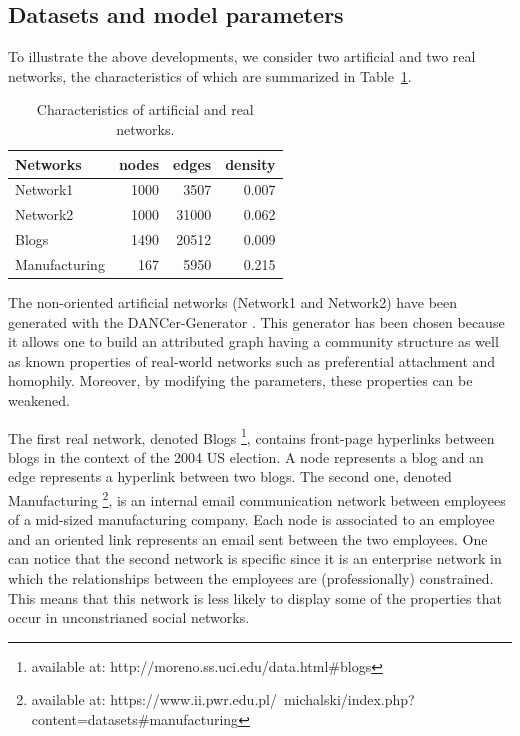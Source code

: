 \subsection{Datasets and model parameters}

To illustrate the above developments, we consider two artificial and two real networks, the characteristics of which are summarized in Table~\ref{table:networks_measures}.

\begin{table}[h] 
	\centering
	\caption{Characteristics of artificial and real networks.}
    \begin{tabular}{lrrr}
        \hline
        \textbf{Networks} &   nodes &   edges &   density \\
        \hline
        Network1 &    1000 &    3507 &     0.007 \\
        Network2 &    1000 &   31000 &     0.062 \\
        Blogs         &    1490 &   20512 &     0.009 \\
        Manufacturing &     167 &    5950 &     0.215 \\
    \hline
    \end{tabular}
	\label{table:networks_measures}
\end{table}

The non-oriented artificial networks (Network1 and Network2) have been generated with the DANCer-Generator \cite{largeron2015}. This generator has been chosen because it allows one to build an attributed graph having a community structure as well as known properties of real-world networks such as preferential attachment and homophily. Moreover, by modifying the parameters, these properties can be weakened.

The first real network, denoted Blogs \footnote{available at: http://moreno.ss.uci.edu/data.html\#blogs}, contains front-page hyperlinks between blogs in the context of the 2004 US election. A node represents a blog and an edge represents a hyperlink between two blogs. The second one, denoted Manufacturing \footnote{available at: https://www.ii.pwr.edu.pl/~michalski/index.php?content=datasets\#manufacturing}, is an internal email communication network between employees of a mid-sized manufacturing company. Each node is associated to an employee and an oriented link represents an email sent between the two employees. One can notice that the second network is specific since it is an enterprise network in which the relationships between the employees are (professionally) constrained. This means that this network is less likely to display some of the properties that occur in unconstrianed social networks.

